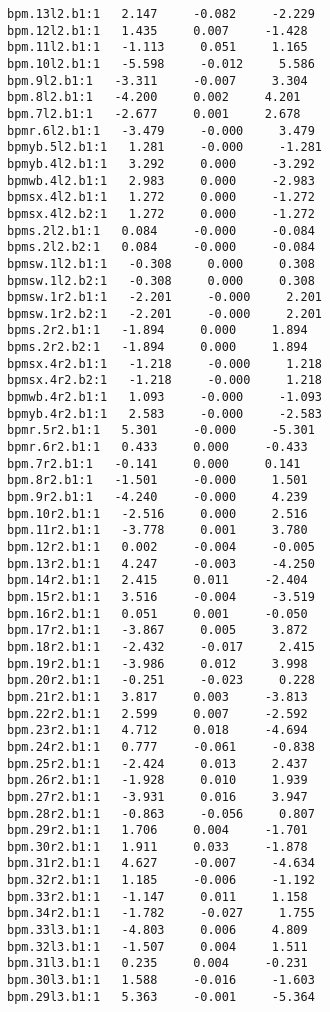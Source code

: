 \begin{verbatim}
bpm.13l2.b1:1   2.147     -0.082     -2.229
bpm.12l2.b1:1   1.435     0.007     -1.428
bpm.11l2.b1:1   -1.113     0.051     1.165
bpm.10l2.b1:1   -5.598     -0.012     5.586
bpm.9l2.b1:1   -3.311     -0.007     3.304
bpm.8l2.b1:1   -4.200     0.002     4.201
bpm.7l2.b1:1   -2.677     0.001     2.678
bpmr.6l2.b1:1   -3.479     -0.000     3.479
bpmyb.5l2.b1:1   1.281     -0.000     -1.281
bpmyb.4l2.b1:1   3.292     0.000     -3.292
bpmwb.4l2.b1:1   2.983     0.000     -2.983
bpmsx.4l2.b1:1   1.272     0.000     -1.272
bpmsx.4l2.b2:1   1.272     0.000     -1.272
bpms.2l2.b1:1   0.084     -0.000     -0.084
bpms.2l2.b2:1   0.084     -0.000     -0.084
bpmsw.1l2.b1:1   -0.308     0.000     0.308
bpmsw.1l2.b2:1   -0.308     0.000     0.308
bpmsw.1r2.b1:1   -2.201     -0.000     2.201
bpmsw.1r2.b2:1   -2.201     -0.000     2.201
bpms.2r2.b1:1   -1.894     0.000     1.894
bpms.2r2.b2:1   -1.894     0.000     1.894
bpmsx.4r2.b1:1   -1.218     -0.000     1.218
bpmsx.4r2.b2:1   -1.218     -0.000     1.218
bpmwb.4r2.b1:1   1.093     -0.000     -1.093
bpmyb.4r2.b1:1   2.583     -0.000     -2.583
bpmr.5r2.b1:1   5.301     -0.000     -5.301
bpmr.6r2.b1:1   0.433     0.000     -0.433
bpm.7r2.b1:1   -0.141     0.000     0.141
bpm.8r2.b1:1   -1.501     -0.000     1.501
bpm.9r2.b1:1   -4.240     -0.000     4.239
bpm.10r2.b1:1   -2.516     0.000     2.516
bpm.11r2.b1:1   -3.778     0.001     3.780
bpm.12r2.b1:1   0.002     -0.004     -0.005
bpm.13r2.b1:1   4.247     -0.003     -4.250
bpm.14r2.b1:1   2.415     0.011     -2.404
bpm.15r2.b1:1   3.516     -0.004     -3.519
bpm.16r2.b1:1   0.051     0.001     -0.050
bpm.17r2.b1:1   -3.867     0.005     3.872
bpm.18r2.b1:1   -2.432     -0.017     2.415
bpm.19r2.b1:1   -3.986     0.012     3.998
bpm.20r2.b1:1   -0.251     -0.023     0.228
bpm.21r2.b1:1   3.817     0.003     -3.813
bpm.22r2.b1:1   2.599     0.007     -2.592
bpm.23r2.b1:1   4.712     0.018     -4.694
bpm.24r2.b1:1   0.777     -0.061     -0.838
bpm.25r2.b1:1   -2.424     0.013     2.437
bpm.26r2.b1:1   -1.928     0.010     1.939
bpm.27r2.b1:1   -3.931     0.016     3.947
bpm.28r2.b1:1   -0.863     -0.056     0.807
bpm.29r2.b1:1   1.706     0.004     -1.701
bpm.30r2.b1:1   1.911     0.033     -1.878
bpm.31r2.b1:1   4.627     -0.007     -4.634
bpm.32r2.b1:1   1.185     -0.006     -1.192
bpm.33r2.b1:1   -1.147     0.011     1.158
bpm.34r2.b1:1   -1.782     -0.027     1.755
bpm.33l3.b1:1   -4.803     0.006     4.809
bpm.32l3.b1:1   -1.507     0.004     1.511
bpm.31l3.b1:1   0.235     0.004     -0.231
bpm.30l3.b1:1   1.588     -0.016     -1.603
bpm.29l3.b1:1   5.363     -0.001     -5.364

\end{verbatim}
